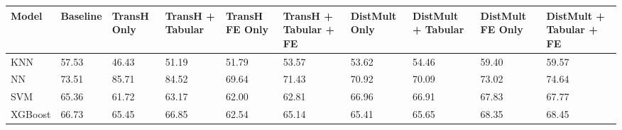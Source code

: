 \begin{tabular}{llllllllll}
\toprule
Model & Baseline & TransH Only & TransH + Tabular & TransH FE Only & TransH + Tabular + FE & DistMult Only & DistMult + Tabular & DistMult FE Only & DistMult + Tabular + FE \\
\midrule
KNN & 57.53 & 46.43 & 51.19 & 51.79 & 53.57 & 53.62 & 54.46 & 59.40 & 59.57 \\
NN & 73.51 & 85.71 & 84.52 & 69.64 & 71.43 & 70.92 & 70.09 & 73.02 & 74.64 \\
SVM & 65.36 & 61.72 & 63.17 & 62.00 & 62.81 & 66.96 & 66.91 & 67.83 & 67.77 \\
XGBoost & 66.73 & 65.45 & 66.85 & 62.54 & 65.14 & 65.41 & 65.65 & 68.35 & 68.45 \\
\bottomrule
\end{tabular}
